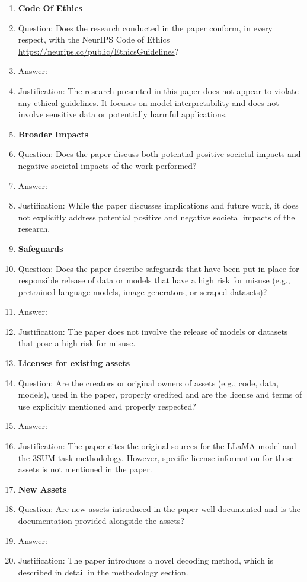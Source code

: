 \documentclass{article}
\begin{document}
\begin{enumerate}
\item {\bf Code Of Ethics}
    \item[] Question: Does the research conducted in the paper conform, in every respect, with the NeurIPS Code of Ethics \url{https://neurips.cc/public/EthicsGuidelines}?
    \item[] Answer: \answerYes{} 
    \item[] Justification: The research presented in this paper does not appear to violate any ethical guidelines. It focuses on model interpretability and does not involve sensitive data or potentially harmful applications.

\item {\bf Broader Impacts}
    \item[] Question: Does the paper discuss both potential positive societal impacts and negative societal impacts of the work performed?
    \item[] Answer: \answerNo{} 
    \item[] Justification: While the paper discusses implications and future work, it does not explicitly address potential positive and negative societal impacts of the research.

\item {\bf Safeguards}
    \item[] Question: Does the paper describe safeguards that have been put in place for responsible release of data or models that have a high risk for misuse (e.g., pretrained language models, image generators, or scraped datasets)?
    \item[] Answer: \answerNA{} 
    \item[] Justification: The paper does not involve the release of models or datasets that pose a high risk for misuse.

\item {\bf Licenses for existing assets}
    \item[] Question: Are the creators or original owners of assets (e.g., code, data, models), used in the paper, properly credited and are the license and terms of use explicitly mentioned and properly respected?
    \item[] Answer: \answerYes{} 
    \item[] Justification: The paper cites the original sources for the LLaMA model and the 3SUM task methodology. However, specific license information for these assets is not mentioned in the paper.

\item {\bf New Assets}
    \item[] Question: Are new assets introduced in the paper well documented and is the documentation provided alongside the assets?
    \item[] Answer: \answerYes{} 
    \item[] Justification: The paper introduces a novel decoding method, which is described in detail in the methodology section.


\end{enumerate}
\end{document}
